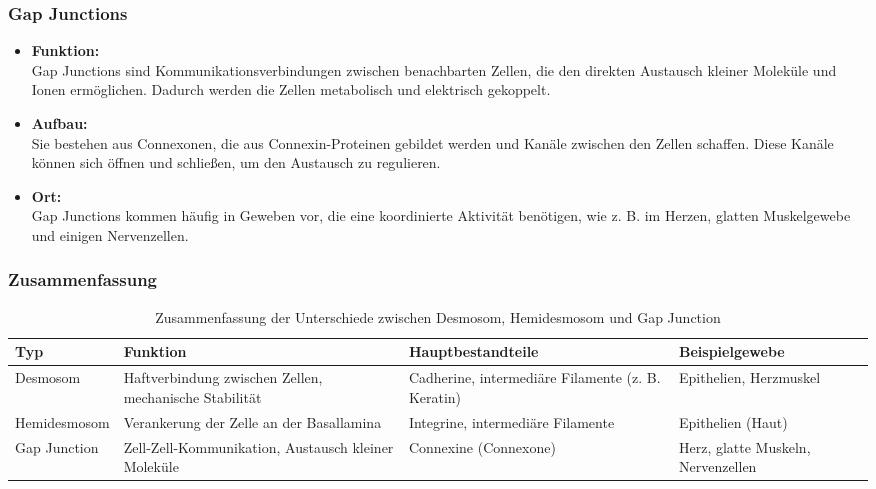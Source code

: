 \documentclass{article}
\begin{document}
\subsubsection{Gap Junctions}
\begin{itemize}
    \item \textbf{Funktion:}\\
        Gap Junctions sind Kommunikationsverbindungen zwischen benachbarten Zellen, die den direkten Austausch kleiner Moleküle und Ionen ermöglichen. Dadurch werden die Zellen metabolisch und elektrisch gekoppelt.
    \item \textbf{Aufbau:}\\
        Sie bestehen aus Connexonen, die aus Connexin-Proteinen gebildet werden und Kanäle zwischen den Zellen schaffen. Diese Kanäle können sich öffnen und schließen, um den Austausch zu regulieren.
    \item \textbf{Ort:}\\
        Gap Junctions kommen häufig in Geweben vor, die eine koordinierte Aktivität benötigen, wie z. B. im Herzen, glatten Muskelgewebe und einigen Nervenzellen.
\end{itemize}
\subsubsection{Zusammenfassung}
\begin{table}[h!]
    \centering
    \begin{tabular}{|>{\raggedright\arraybackslash}p{2.2cm}|
        >{\raggedright\arraybackslash}p{3cm}|
        >{\raggedright\arraybackslash}p{2.6cm}|
        >{\raggedright\arraybackslash}p{2.5cm}|}
        \hline
        \textbf{Typ} & \textbf{Funktion} & \textbf{Hauptb\-estandteile} & \textbf{Beispiel\-gewebe} \\
        \hline
        \footnotesize
        Desmosom & Haftverbindung zwischen Zellen, mechanische Stabilität & Cadherine, intermediäre Filamente (z. B. Keratin) & Epithelien, Herzmuskel \\
        \hline
        \footnotesize
        Hemidesmosom & Verankerung der Zelle an der Basallamina & Integrine, intermediäre Filamente & Epithelien (Haut) \\
        \hline
        \footnotesize
        Gap Junction & Zell-Zell-Kommunikation, Austausch kleiner Moleküle & Connexine (Connexone) & Herz, glatte Muskeln, Nervenzellen \\
        \hline
    \end{tabular}
    \caption{Zusammenfassung der Unterschiede zwischen Desmosom, Hemidesmosom und Gap Junction}
\end{table}
\end{document}
